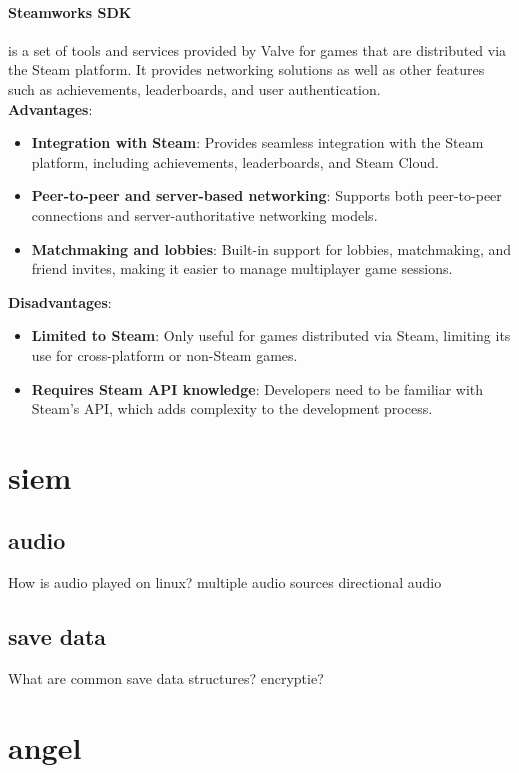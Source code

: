 \documentclass{article} %
\begin{document}
\paragraph{Steamworks SDK} is a set of tools and services provided by Valve for games that are distributed via the Steam platform. It provides networking solutions as well as other features such as achievements, leaderboards, and user authentication.
\\
\textbf{Advantages}:
\begin{itemize}
    \item \textbf{Integration with Steam}: Provides seamless integration with the Steam platform, including achievements, leaderboards, and Steam Cloud.
    \item \textbf{Peer-to-peer and server-based networking}: Supports both peer-to-peer connections and server-authoritative networking models.
    \item \textbf{Matchmaking and lobbies}: Built-in support for lobbies, matchmaking, and friend invites, making it easier to manage multiplayer game sessions.
\end{itemize}

\textbf{Disadvantages}:
\begin{itemize}
    \item \textbf{Limited to Steam}: Only useful for games distributed via Steam, limiting its use for cross-platform or non-Steam games.
    \item \textbf{Requires Steam API knowledge}: Developers need to be familiar with Steam's API, which adds complexity to the development process.
\end{itemize}

\newpage

\section{siem}
\subsection{audio}
How is audio played on linux?
multiple audio sources
directional audio
\subsection{save data}
What are common save data structures?
encryptie?
\newpage

\section{angel}
\end{document}

